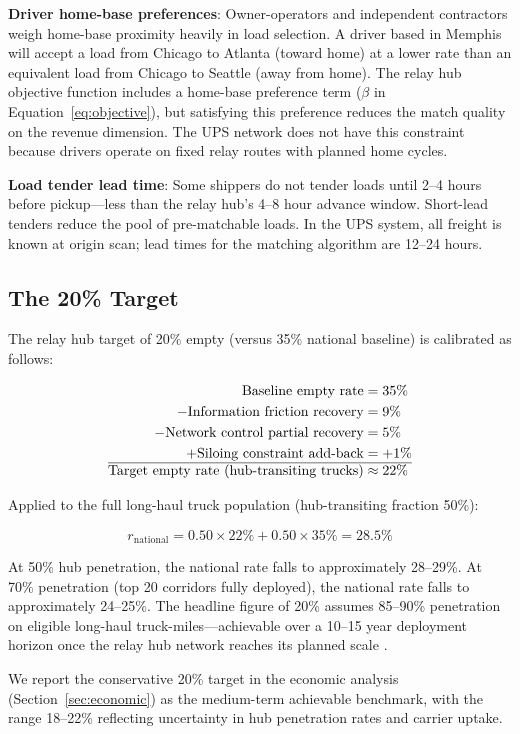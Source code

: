 \textbf{Driver home-base preferences}: Owner-operators and independent contractors weigh home-base proximity heavily in load selection. A driver based in Memphis will accept a load from Chicago to Atlanta (toward home) at a lower rate than an equivalent load from Chicago to Seattle (away from home). The relay hub objective function includes a home-base preference term ($\beta$ in Equation~\ref{eq:objective}), but satisfying this preference reduces the match quality on the revenue dimension. The UPS network does not have this constraint because drivers operate on fixed relay routes with planned home cycles.

\textbf{Load tender lead time}: Some shippers do not tender loads until 2--4 hours before pickup---less than the relay hub's 4--8 hour advance window. Short-lead tenders reduce the pool of pre-matchable loads. In the UPS system, all freight is known at origin scan; lead times for the matching algorithm are 12--24 hours.

\subsection{The 20\% Target}

The relay hub target of 20\% empty (versus 35\% national baseline) is calibrated as follows:

\begin{align}
  \text{Baseline empty rate} &= 35\% \notag \\
  - \text{Information friction recovery} &= 9\% \notag \\
  - \text{Network control partial recovery} &= 5\% \notag \\
  + \text{Siloing constraint add-back} &= +1\% \notag \\
  \hline
  \text{Target empty rate (hub-transiting trucks)} &\approx 22\% \notag
\end{align}

Applied to the full long-haul truck population (hub-transiting fraction 50\%):

\begin{equation}
  r_{\text{national}} = 0.50 \times 22\% + 0.50 \times 35\% = 28.5\%
\end{equation}

At 50\% hub penetration, the national rate falls to approximately 28--29\%. At 70\% penetration (top 20 corridors fully deployed), the national rate falls to approximately 24--25\%. The headline figure of 20\% assumes 85--90\% penetration on eligible long-haul truck-miles---achievable over a 10--15 year deployment horizon once the relay hub network reaches its planned scale \citep{ROUTE_C1}.

We report the conservative 20\% target in the economic analysis (Section~\ref{sec:economic}) as the medium-term achievable benchmark, with the range 18--22\% reflecting uncertainty in hub penetration rates and carrier uptake.
